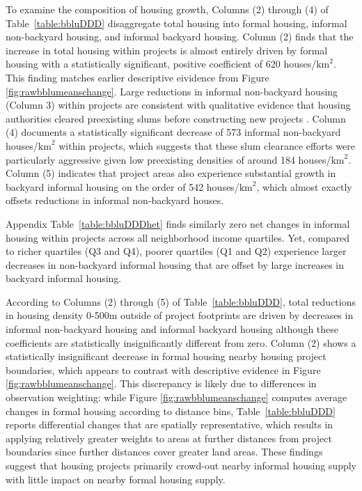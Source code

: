 \documentclass[12pt]{article}
\begin{document}

To examine the composition of housing growth, Columns (2) through (4) of Table~\ref{table:bbluDDD} disaggregate total housing into formal housing, informal non-backyard housing, and informal backyard housing.  Column (2) finds that the increase in total housing within projects is almost entirely driven by formal housing with a statistically significant, positive coefficient of 620 houses/$\text{km}^{2}$.  This finding matches earlier descriptive eividence from Figure \ref{fig:rawbblumeanschange}.  Large reductions in informal non-backyard housing (Column 3) within projects are consistent with qualitative evidence that housing authorities cleared preexisting slums before constructing new projects \citep{hofmeyr2008risk}.  Column (4) documents a statistically significant decrease of 573 informal non-backyard houses/$\text{km}^{2}$ within projects, which suggests that these slum clearance efforts were particularly aggressive given low preexisting densities of around 184 houses/$\text{km}^{2}$.  Column (5) indicates that project areas also experience substantial growth in backyard informal housing on the order of 542 houses/$\text{km}^{2}$, which almost exactly offsets reductions in informal non-backyard houses.    

Appendix Table~\ref{table:bbluDDDhet} finds similarly zero net changes in informal housing within projects across all neighborhood income quartiles.  Yet, compared to richer quartiles (Q3 and Q4), poorer quartiles (Q1 and Q2) experience larger decreases in non-backyard informal housing that are offset by large increases in backyard informal housing.

According to Columns (2) through (5) of Table~\ref{table:bbluDDD}, total reductions in housing density 0-500m outside of project footprints are driven by decreases in informal non-backyard housing and informal backyard housing although these coefficients are statistically insignificantly different from zero.  Column (2) shows a statistically insignificant decrease in formal housing nearby housing project boundaries, which appears to contrast with descriptive evidence in Figure \ref{fig:rawbblumeanschange}.  This discrepancy is likely due to differences in observation weighting: while Figure \ref{fig:rawbblumeanschange} computes average changes in formal housing according to distance bins, Table~\ref{table:bbluDDD} reports differential changes that are spatially representative, which results in applying relatively greater weights to areas at further distances from project boundaries since further distances cover greater land areas.  These findings suggest that housing projects primarily crowd-out nearby informal housing supply with little impact on nearby formal housing supply.
\end{document}
